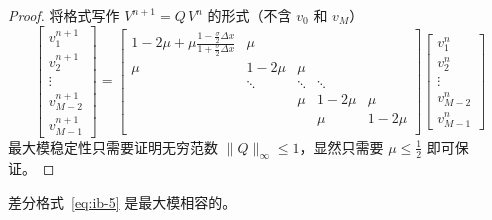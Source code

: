 \begin{proof}
    将格式写作 $V^{n+1} = Q\, V^n$ 的形式（不含 $v_0$ 和 $v_{M}$）
    \[
        \begin{bmatrix}
            v_1^{n+1} \\ v_2^{n+1} \\ \vdots \\ v_{M-2}^{n+1} \\ v_{M-1}^{n+1}
        \end{bmatrix}
        =
        \begin{bmatrix}
            1-2\mu + \mu\frac{1-\frac{\sigma}2 \Delta x}{1 + \frac{\sigma}2 \Delta x} & \mu    &        &        &        \\
            \mu                                                                       & 1-2\mu & \mu    &        &        \\
                                                                                      & \ddots & \ddots & \ddots &        \\
                                                                                      &        & \mu    & 1-2\mu & \mu    \\
                                                                                      &        &        & \mu    & 1-2\mu \\
        \end{bmatrix}
        \begin{bmatrix}
            v_1^{n} \\ v_2^{n} \\ \vdots \\ v_{M-2}^{n} \\ v_{M-1}^{n}
        \end{bmatrix}
    \]
    最大模稳定性只需要证明无穷范数 $\|Q\|_{\infty} \le 1$，显然只需要 $\mu \le \frac12$ 即可保证。
\end{proof}

\begin{example}
    差分格式~\eqref{eq:ib-5} 是最大模相容的。
\end{example}


